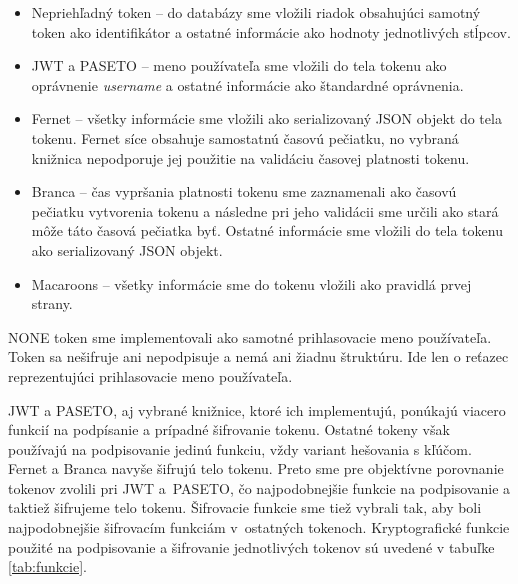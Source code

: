 \begin{itemize}
    \item Nepriehľadný token -- do databázy sme vložili riadok obsahujúci samotný token ako identifikátor a ostatné informácie ako hodnoty jednotlivých stĺpcov.
    \item JWT a PASETO -- meno používateľa sme vložili do tela tokenu ako oprávnenie \textit{username} a ostatné informácie ako štandardné oprávnenia.
    \item Fernet -- všetky informácie sme vložili ako serializovaný JSON objekt do tela tokenu. Fernet síce obsahuje samostatnú časovú pečiatku, no vybraná knižnica nepodporuje jej použitie na validáciu časovej platnosti tokenu.
    \item Branca -- čas vypršania platnosti tokenu sme zaznamenali ako časovú pečiatku vytvorenia tokenu a následne pri jeho validácii sme určili ako stará môže táto časová pečiatka byť. Ostatné informácie sme vložili do tela tokenu ako serializovaný JSON objekt.
    \item Macaroons -- všetky informácie sme do tokenu vložili ako pravidlá prvej strany.
\end{itemize}

NONE token sme implementovali ako samotné prihlasovacie meno používateľa. Token sa nešifruje ani nepodpisuje a nemá ani žiadnu štruktúru. Ide len o reťazec reprezentujúci prihlasovacie meno používateľa.

JWT a PASETO, aj vybrané knižnice, ktoré ich implementujú, ponúkajú viacero funkcií na podpísanie a prípadné šifrovanie tokenu. Ostatné tokeny však používajú na podpisovanie jedinú funkciu, vždy variant hešovania s kľúčom. Fernet a Branca navyše šifrujú telo tokenu. Preto sme pre objektívne porovnanie tokenov zvolili pri JWT a~PASETO, čo najpodobnejšie funkcie na podpisovanie a taktiež šifrujeme telo tokenu. Šifrovacie funkcie sme tiež vybrali tak, aby boli najpodobnejšie šifrovacím funkciám v~ostatných tokenoch. Kryptografické funkcie použité na podpisovanie a šifrovanie jednotlivých tokenov sú uvedené v tabuľke \ref{tab:funkcie}.

\begin{table}[H]
  \begin{center}
    \caption{Kryptografické funkcie na podpisovanie a šifrovanie tokenov}
    \label{tab:funkcie} %

  \end{center}
\end{table}

